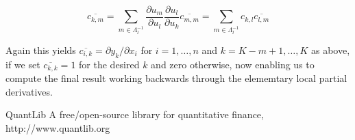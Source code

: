 \documentclass{amsart}
\theoremstyle{plain}
\numberwithin{equation}{section}
\begin{document}
\begin{equation}
\overline{c_{k,m}} = \sum_{m\in\Lambda^{-1}_l} \frac{\partial u_m}{\partial u_l} \frac{\partial u_l}{\partial u_k} \overline{c_{m,m}} = \sum_{m\in{\Lambda_l^{-1}}} c_{k,l} \overline{c_{l,m}}
\end{equation}

Again this yields $\overline{c_{i,k}} = \partial{y_k}/\partial{x_i}$ for $i=1,\dots,n$ and $k=K-m+1,\dots,K$ as above, if we set $\overline{c_{k,k}} = 1$ for the desired $k$ and zero otherwise, now enabling us to compute the final result working backwards through the elememtary local partial derivatives.




\begin{thebibliography}{2}

QuantLib A free/open-source library for quantitative finance, http://www.quantlib.org

\end{thebibliography}
\end{document}
